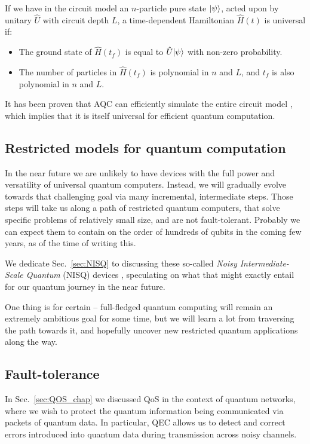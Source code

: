 If we have in the circuit model an $n$-particle pure state $|\psi\rangle$, acted upon by unitary $\hat{U}$ with circuit depth $L$, a time-dependent Hamiltonian $\hat{H}(t)$ is universal if:
\begin{itemize}
\item The ground state of $\hat{H}(t_f)$ is equal to $\hat{U}|\psi\rangle$ with non-zero probability.
\item The number of particles in $\hat{H}(t_f)$ is polynomial in $n$ and $L$, and $t_f$ is also polynomial in $n$ and $L$.
\end{itemize}
It has been proven that AQC can efficiently simulate the entire circuit model \cite{bib:RevModPhys.90.015002}, which implies that it is itself universal for efficient quantum computation.

%
%

\subsection{Restricted models for quantum computation} \label{sec:restricted_models} 

In the near future we are unlikely to have devices with the full power and versatility of universal quantum computers. Instead, we will gradually evolve towards that challenging goal via many incremental, intermediate steps. Those steps will take us along a path of restricted quantum computers, that solve specific problems of relatively small size, and are not fault-tolerant. Probably we can expect them to contain on the order of hundreds of qubits in the coming few years, as of the time of writing this.

We dedicate Sec.~\ref{sec:NISQ} to discussing these so-called \textit{Noisy Intermediate-Scale Quantum} (NISQ) devices \cite{bib:preskill2018quantum}, speculating on what that might exactly entail for our quantum journey in the near future.

One thing is for certain -- full-fledged quantum computing will remain an extremely ambitious goal for some time, but we will learn a lot from traversing the path towards it, and hopefully uncover new restricted quantum applications along the way.

%
%

\subsection{Fault-tolerance}\label{sec:fault_tolerance}
In Sec.~\ref{sec:QOS_chap} we discussed QoS in the context of quantum networks, where we wish to protect the quantum information being communicated via packets of quantum data. In particular, QEC allows us to detect and correct errors introduced into quantum data during transmission across noisy channels.

